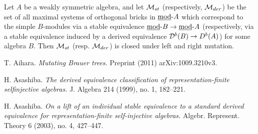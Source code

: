 \documentclass{amsart}
\begin{document}
\begin{coro} Let $A$ be a weakly symmetric algebra, and let $\mathcal{M}_{st}$ (respectively, $\mathcal{M}_{der}$) be the set of all maximal systems of orthogonal bricks in $\mbox{\underline{mod}-} A$ which correspond to the simple $B$-modules via a stable equivalence $\mbox{\underline{mod}-} B \rightarrow \mbox{\underline{mod}-} A$ (respectively, via a stable equivalence induced by a derived equivalence $\mathcal{D}^b(B) \rightarrow D^b(A)$) for some algebra $B$.  Then $\mathcal{M}_{st}$ (resp. $\mathcal{M}_{der}$) is closed under left and right mutation.
\end{coro}

\begin{thebibliography}{99}


 T. Aihara.  \emph{Mutating Brauer trees.}  Preprint (2011) arXiv:1009.3210v3.




 H. Asashiba.  \emph{The derived equivalence classification of representation-finite selfinjective algebras.}  J. Algebra 214 (1999), no. 1, 182--221.

 H. Asashiba.  \emph{On a lift of an individual stable equivalence to a standard derived equivalence for representation-finite self-injective algebras.}  Algebr. Represent. Theory 6 (2003), no. 4, 427--447.






\end{thebibliography}
\end{document}
